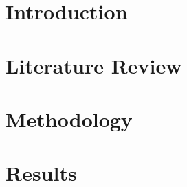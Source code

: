 \documentclass[14pt,a4paper]{extreport}
\begin{document}

\tableofcontents
\clearpage

\chapter*{Introduction}



\chapter{Literature Review}



\chapter{Methodology}



\chapter{Results}





\renewcommand{\bibname}{References}




% 
\end{document}
